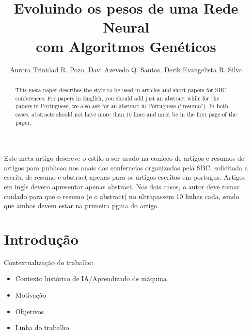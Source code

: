 \documentclass[12pt]{article}
\title{Evoluindo os pesos de uma Rede Neural \\com Algoritmos Genéticos}
\author{Aurora Trinidad R. Pozo\inst{1}, Davi Azevedo Q. Santos\inst{1}, Derik Evangelista R. Silva\inst{1}}
\begin{document}
 

\maketitle

\begin{abstract}
  This meta-paper describes the style to be used in articles and short papers
  for SBC conferences. For papers in English, you should add just an abstract
  while for the papers in Portuguese, we also ask for an abstract in
  Portuguese (``resumo''). In both cases, abstracts should not have more than
  10 lines and must be in the first page of the paper.
\end{abstract}
     
\begin{resumo} 
  Este meta-artigo descreve o estilo a ser usado na confeco de artigos e
  resumos de artigos para publicao nos anais das conferncias organizadas
  pela SBC.  solicitada a escrita de resumo e abstract apenas para os artigos
  escritos em portugus. Artigos em ingls devero apresentar apenas abstract.
  Nos dois casos, o autor deve tomar cuidado para que o resumo (e o abstract)
  no ultrapassem 10 linhas cada, sendo que ambos devem estar na primeira
  pgina do artigo.
\end{resumo}















\section{Introdução}

Contextualização do trabalho: 
\begin{itemize}
\item Contexto histórico de IA/Aprendizado de máquina
\item Motivação
\item Objetivos
\item Linha do trabalho
\end{itemize}
\end{document}
